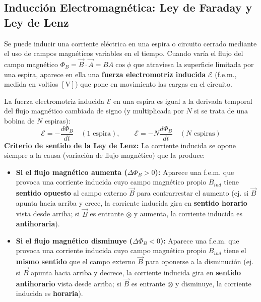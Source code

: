 \subsection{Inducción Electromagnética: Ley de Faraday y Ley de Lenz}

Se puede inducir una corriente eléctrica en una espira o circuito cerrado mediante el uso de campos magnéticos variables en el tiempo. Cuando varía el flujo del campo magnético $\Phi_B = \vec{B}\cdot\vec{A} = B A \cos\phi$ que atraviesa la superficie limitada por una espira, aparece en ella una \textbf{fuerza electromotriz inducida} $\mathcal{E}$ (f.e.m., medida en voltios $[\si{\volt}]$) que pone en movimiento las cargas en el circuito.

\begin{ley}
La fuerza electromotriz inducida $\mathcal{E}$ en una espira es igual a la derivada temporal del flujo magnético cambiada de signo (y multiplicada por $N$ si se trata de una bobina de $N$ espiras):
\begin{equation}
    \mathcal{E} = -\frac{d\Phi_B}{dt} \quad (\text{1 espira}), \qquad \mathcal{E} = -N \frac{d\Phi_B}{dt} \quad (N\text{ espiras})
\end{equation}
\textbf{Criterio de sentido de la Ley de Lenz:} La corriente inducida se opone siempre a la causa (variación de flujo magnético) que la produce:
\begin{itemize}[leftmargin=*]
    \item \textbf{Si el flujo magnético aumenta ($\Delta\Phi_B > 0$):} Aparece una f.e.m. que provoca una corriente inducida cuyo campo magnético propio $B_{ind}$ tiene \textbf{sentido opuesto} al campo externo $\vec{B}$ para contrarrestar el aumento (ej. si $\vec{B}$ apunta hacia arriba y crece, la corriente inducida gira en \textbf{sentido horario} vista desde arriba; si $\vec{B}$ es entrante $\otimes$ y aumenta, la corriente inducida es \textbf{antihoraria}).
    \item \textbf{Si el flujo magnético disminuye ($\Delta\Phi_B < 0$):} Aparece una f.e.m. que provoca una corriente inducida cuyo campo magnético propio $B_{ind}$ tiene el \textbf{mismo sentido} que el campo externo $\vec{B}$ para oponerse a la disminución (ej. si $\vec{B}$ apunta hacia arriba y decrece, la corriente inducida gira en \textbf{sentido antihorario} vista desde arriba; si $\vec{B}$ es entrante $\otimes$ y disminuye, la corriente inducida es \textbf{horaria}).
\end{itemize}
\end{ley}

